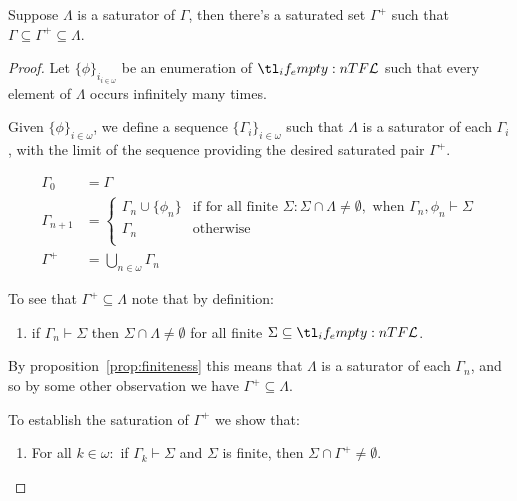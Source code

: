 \documentclass[10pt]{article}
\begin{document}
\begin{lemma}[Lindenbaum]\label{lindenbaum:left}
  Suppose \(\Lambda\) is a  saturator of \(\Gamma\), then there's a saturated set \(\Gamma^{+}\) such that \(\Gamma \subseteq \Gamma^{+} \subseteq \Lambda\).
  \begin{proof}
    Let \(\{\phi\}_{i_{i \in \omega}}\) be an enumeration of \(\olang{}\) such that every element of \(\Lambda\) occurs infinitely many times.\nolinebreak

    Given \(\{\phi\}_{i \in \omega}\), we define a sequence \(\{\Gamma_{i}\}_{i \in \omega}\) such that \(\Lambda\) is a saturator of each \(\Gamma_{i}\), with the limit of the sequence providing the desired saturated pair \(\Gamma^{+}\).

    \begin{align*}
      \Gamma_{0} &= \Gamma \\
      \Gamma_{n+1} &=
                     \begin{cases}
                       \Gamma_{n} \cup \{\phi_{n}\} &\text{if for all finite } \Sigma \colon \Sigma \cap \Lambda \ne \emptyset, \text{ when } \Gamma_{n},\phi_{n} \vdash \Sigma \\
                       \Gamma_{n}
                       &\text{otherwise} \\
                     \end{cases}
      \\
      \Gamma^{+} &= \bigcup_{n \in \omega}\Gamma_{n}
    \end{align*}

    To see that \(\Gamma^{+} \subseteq \Lambda\) note that by definition:
    \begin{enumerate}[label=(\arabic*)]
    \item\label{leftLindenbaum:1} if \(\Gamma_{n} \vdash \Sigma\) then \(\Sigma \cap \Lambda \ne \emptyset\) for all finite \(\Sigma \subseteq \olang{}\).
    \end{enumerate}
    By proposition~\ref{prop:finiteness} this means that \(\Lambda\) is a saturator of each \(\Gamma_{n}\), and so by some other observation we have \(\Gamma^{+} \subseteq \Lambda\).

    To establish the saturation of \(\Gamma^{+}\) we show that:
    \begin{enumerate}[label=(\arabic*),resume]
    \item\label{leftLindenbaum:2} For all \(k \in \omega \colon\) if \(\Gamma_{k} \vdash \Sigma\) and \(\Sigma\) is finite, then \(\Sigma \cap \Gamma^{+} \ne \emptyset\).
    \end{enumerate}


\end{proof}
\end{lemma}
\end{document}
